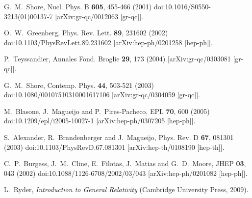 \documentclass[jkps,preprint,fleqn]{revtex4} %
\begin{document}
\begin{thebibliography}{999}
G.~M.~Shore,
Nucl. Phys. B \textbf{605}, 455-466 (2001)
doi:10.1016/S0550-3213(01)00137-7
[arXiv:gr-qc/0012063 [gr-qc]].

O.~W.~Greenberg,
Phys. Rev. Lett. \textbf{89}, 231602 (2002)
doi:10.1103/PhysRevLett.89.231602
[arXiv:hep-ph/0201258 [hep-ph]].


P.~Teyssandier,
Annales Fond. Broglie \textbf{29}, 173 (2004)
[arXiv:gr-qc/0303081 [gr-qc]].

G.~M.~Shore,
Contemp. Phys. \textbf{44}, 503-521 (2003)
doi:10.1080/00107510310001617106
[arXiv:gr-qc/0304059 [gr-qc]].

M.~Blasone, J.~Magueijo and P.~Pires-Pacheco,
EPL \textbf{70}, 600 (2005)
doi:10.1209/epl/i2005-10027-1
[arXiv:hep-ph/0307205 [hep-ph]].



S.~Alexander, R.~Brandenberger and J.~Magueijo,
Phys. Rev. D \textbf{67}, 081301 (2003)
doi:10.1103/PhysRevD.67.081301
[arXiv:hep-th/0108190 [hep-th]].

C.~P.~Burgess, J.~M.~Cline, E.~Filotas, J.~Matias and G.~D.~Moore,
JHEP \textbf{03}, 043 (2002)
doi:10.1088/1126-6708/2002/03/043
[arXiv:hep-ph/0201082 [hep-ph]].


 L.~Ryder, \textit{Introduction to General Relativity} (Cambridge University Press,  2009).


\end{thebibliography}
\end{document}
